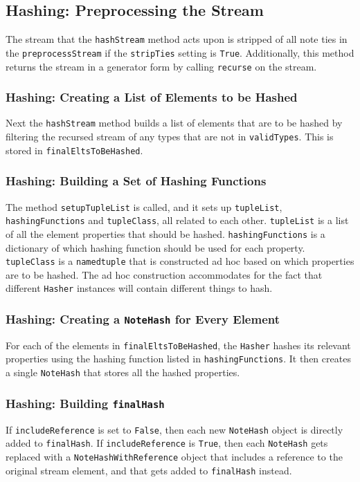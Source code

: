         \subsection{Hashing: Preprocessing the Stream}
        The stream that the \texttt{hashStream} method acts upon is stripped of all note ties in the \texttt{preprocessStream} if the \texttt{stripTies} setting is \texttt{True}. Additionally, this method returns the stream in a generator form by calling \texttt{recurse} on the stream. 
        
        \subsubsection{Hashing: Creating a List of Elements to be Hashed}
        Next the \texttt{hashStream} method builds a list of elements that are to be hashed by filtering the recursed stream of any types that are not in \texttt{validTypes}. This is stored in \texttt{finalEltsToBeHashed}.
        
        \subsubsection{Hashing: Building a Set of Hashing Functions}
        The method \texttt{setupTupleList} is called, and it sets up \texttt{tupleList}, \texttt{hashingFunctions} and \texttt{tupleClass}, all related to each other. \texttt{tupleList} is a list of all the element properties that should be hashed. \texttt{hashingFunctions} is a dictionary of which hashing function should be used for each property. \texttt{tupleClass} is a \texttt{namedtuple} that is constructed ad hoc based on which properties are to be hashed. The ad hoc construction accommodates for the fact that different \texttt{Hasher} instances will contain different things to hash. 
        
        \subsubsection{Hashing: Creating a \texttt{NoteHash} for Every Element}
        For each of the elements in \texttt{finalEltsToBeHashed}, the \texttt{Hasher} hashes its relevant properties using the hashing function listed in \texttt{hashingFunctions}. It then creates a single \texttt{NoteHash} that stores all the hashed properties.
        
        \subsubsection{Hashing: Building \texttt{finalHash}}
        If \texttt{includeReference} is set to \texttt{False}, then each new \texttt{NoteHash} object is directly added to \texttt{finalHash}. If \texttt{includeReference} is \texttt{True}, then each \texttt{NoteHash} gets replaced with a \texttt{NoteHashWithReference} object that includes a reference to the original stream element, and that gets added to \texttt{finalHash} instead.
    
